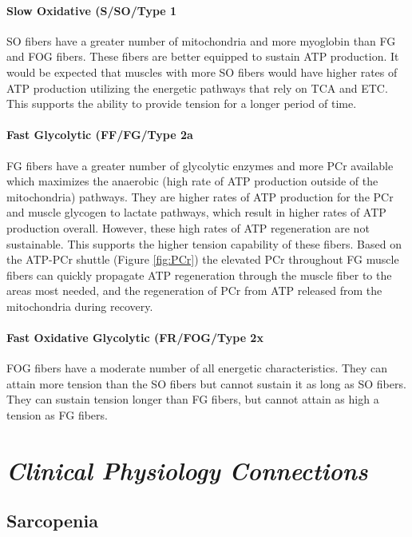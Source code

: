 \paragraph{Slow Oxidative (S/SO/Type 1}

SO fibers have a greater number of mitochondria and more myoglobin than FG and FOG fibers. These fibers are better equipped to sustain ATP production. It would be expected that muscles with more SO fibers would have higher rates of ATP production utilizing the energetic pathways that rely on TCA and ETC. This supports the ability to provide tension for a longer period of time.

\paragraph{Fast Glycolytic (FF/FG/Type 2a}

FG fibers have a greater number of glycolytic enzymes and more PCr available which maximizes the anaerobic (high rate of ATP production outside of the mitochondria) pathways. They are higher rates of ATP production for the PCr and muscle glycogen to lactate pathways, which result in higher rates of ATP production overall. However, these high rates of ATP regeneration are not sustainable. This supports the higher tension capability of these fibers. Based on the ATP-PCr shuttle (Figure \ref{fig:PCr}) the elevated PCr throughout FG muscle fibers can quickly propagate ATP regeneration through the muscle fiber to the areas most needed, and the regeneration of PCr from ATP released from the mitochondria during recovery.

\paragraph{Fast Oxidative Glycolytic (FR/FOG/Type 2x}

FOG fibers have a moderate number of all energetic characteristics. They can attain more tension than the SO fibers but cannot sustain it as long as SO fibers. They can sustain tension longer than FG fibers, but cannot attain as high a tension as FG fibers. 

\section{\textit{Clinical Physiology Connections}}

\subsection{Sarcopenia}

